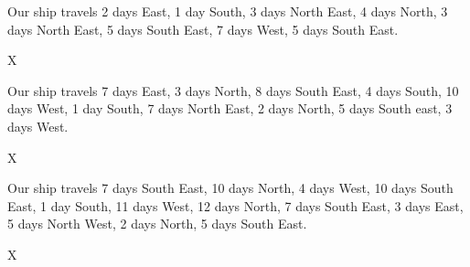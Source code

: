 \documentclass{article}
\begin{document}
\LARGE
\noindent
Our ship travels
2 days East,
1 day South,
3 days North East,
4 days North,
3 days North East,
5 days South East,
7 days West,
5 days South East.


\vspace*{3in}

X



\newpage
\noindent
Our ship travels
7 days East,
3 days North,
8 days South East,
4 days South,
10 days West,
1 day South,
7 days North East,
2 days North,
5 days South east,
3 days West.


\vspace*{3in}

X

\newpage
\noindent
Our ship travels
7 days South East,
10 days North,
4 days West,
10 days South East,
1 day South,
11 days West,
12 days North,
7 days South East,
3 days East,
5 days North West,
2 days North,
5 days South East.


\vspace*{3in}

X
\end{document}
